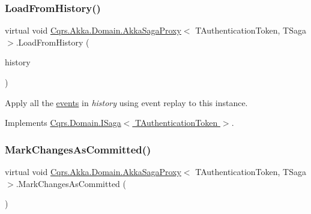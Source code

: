 \subsubsection{\texorpdfstring{Load\+From\+History()}{LoadFromHistory()}}
{\footnotesize\ttfamily virtual void \hyperlink{classCqrs_1_1Akka_1_1Domain_1_1AkkaSagaProxy}{Cqrs.\+Akka.\+Domain.\+Akka\+Saga\+Proxy}$<$ T\+Authentication\+Token, T\+Saga $>$.Load\+From\+History (\begin{DoxyParamCaption}\item[{I\+Enumerable$<$ \hyperlink{interfaceCqrs_1_1Events_1_1ISagaEvent}{I\+Saga\+Event}$<$ T\+Authentication\+Token $>$$>$}]{history }\end{DoxyParamCaption})\hspace{0.3cm}{\ttfamily [virtual]}}



Apply all the \hyperlink{}{events} in {\itshape history}  using event replay to this instance. 



Implements \hyperlink{interfaceCqrs_1_1Domain_1_1ISaga_a2714804684bc65cf4dec79b4697b9b21_a2714804684bc65cf4dec79b4697b9b21}{Cqrs.\+Domain.\+I\+Saga$<$ T\+Authentication\+Token $>$}.

\mbox{\label{classCqrs_1_1Akka_1_1Domain_1_1AkkaSagaProxy_a5a5c012bc0f7f957b8bd2298956ca9ae_a5a5c012bc0f7f957b8bd2298956ca9ae}} 
\subsubsection{\texorpdfstring{Mark\+Changes\+As\+Committed()}{MarkChangesAsCommitted()}}
{\footnotesize\ttfamily virtual void \hyperlink{classCqrs_1_1Akka_1_1Domain_1_1AkkaSagaProxy}{Cqrs.\+Akka.\+Domain.\+Akka\+Saga\+Proxy}$<$ T\+Authentication\+Token, T\+Saga $>$.Mark\+Changes\+As\+Committed (\begin{DoxyParamCaption}{ }\end{DoxyParamCaption})\hspace{0.3cm}{\ttfamily [virtual]}}




